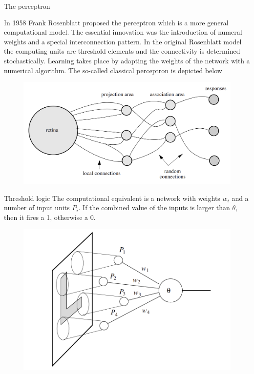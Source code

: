 \documentclass{beamer}
\begin{document}
\begin{frame}{The perceptron}
	
	In 1958 Frank Rosenblatt proposed the perceptron which is a more general computational model. The essential innovation was the introduction of numeral weights and a special interconnection pattern. In the original Rosenblatt model the computing units are threshold elements and the connectivity is determined stochastically. Learning takes place by adapting the weights of the network with a numerical algorithm. The so-called classical perceptron is depicted below
	
			\begin{figure}[h]
		\centering
		\includegraphics[scale=0.4]{Figures/nn_3.1.png}
	\end{figure}	
	
	
\end{frame}

\begin{frame}{Threshold logic}
	The computational equivalent is a network with weights $w_i$ and a number of input units $P_i$. If the combined value of the inputs is larger than $\theta$, then it fires a 1, otherwise a 0.

			\begin{figure}[h]
	\centering
	\includegraphics[scale=0.4]{Figures/nn_3.2.png}
\end{figure}	
	
	
\end{frame}
\end{document}
